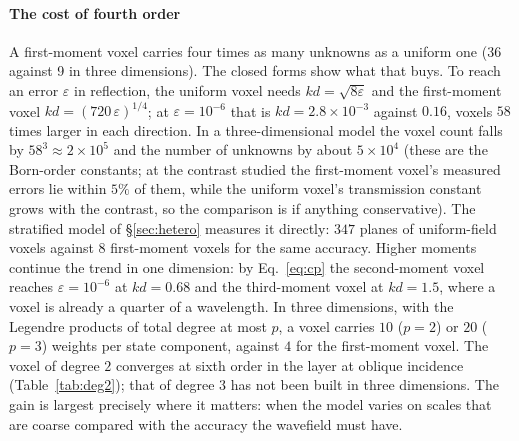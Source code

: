 \documentclass[preprint,review,12pt]{elsarticle}
\begin{document}
\paragraph{The cost of fourth order} A first-moment voxel carries four times as many unknowns as
a uniform one (36 against 9 in three dimensions). The closed forms show what that buys. To reach an
error $\varepsilon$ in reflection, the uniform voxel needs $kd=\sqrt{8\varepsilon}$ and the
first-moment voxel $kd=(720\,\varepsilon)^{1/4}$; at $\varepsilon=10^{-6}$ that is $kd=2.8\times
10^{-3}$ against $0.16$, voxels $58$ times larger in each direction. In a three-dimensional model the
voxel count falls by $58^3\approx2\times10^5$ and the number of unknowns by about $5\times10^4$
(these are the Born-order constants; at the contrast studied the first-moment voxel's measured errors
lie within $5\%$ of them, while the uniform voxel's transmission constant grows with the contrast, so
the comparison is if anything conservative).
The stratified model of \S\ref{sec:hetero} measures it directly: $347$ planes of uniform-field voxels
against $8$ first-moment voxels for the same accuracy. Higher moments continue the trend in one
dimension: by Eq.~\eqref{eq:cp} the second-moment voxel reaches $\varepsilon=10^{-6}$ at $kd=0.68$ and
the third-moment voxel at $kd=1.5$, where a voxel is already a quarter of a wavelength. In three dimensions, with the Legendre products of total degree at most $p$, a voxel carries $10$
($p=2$) or $20$ ($p=3$) weights per state component, against $4$ for the first-moment voxel. The voxel
of degree $2$ converges at sixth order in the layer at oblique incidence (Table~\ref{tab:deg2}); that of
degree $3$ has not been built in three dimensions. The gain is largest precisely where it matters: when the model varies on scales that are coarse
compared with the accuracy the wavefield must have.
\end{document}
